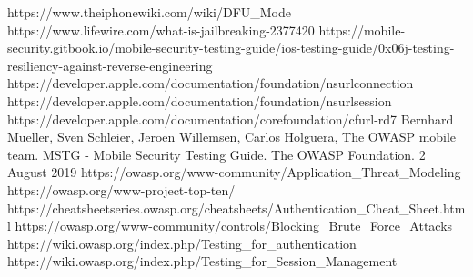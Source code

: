 \documentclass[runningheads]{llncs}
\begin{document}


\newpage
\hfill

%





%
%
%
% 
% 
%

\begin{thebibliography}{8}


 https://www.theiphonewiki.com/wiki/DFU\_Mode
 https://www.lifewire.com/what-is-jailbreaking-2377420
 https://mobile-security.gitbook.io/mobile-security-testing-guide/ios-testing-guide/0x06j-testing-resiliency-against-reverse-engineering
 https://developer.apple.com/documentation/foundation/nsurlconnection
 https://developer.apple.com/documentation/foundation/nsurlsession
 https://developer.apple.com/documentation/corefoundation/cfurl-rd7
 Bernhard Mueller, Sven Schleier, Jeroen Willemsen, Carlos Holguera, The OWASP mobile team. MSTG - Mobile Security Testing Guide. The OWASP Foundation. 2 August 2019
 https://owasp.org/www-community/Application\_Threat\_Modeling
 https://owasp.org/www-project-top-ten/
 https://cheatsheetseries.owasp.org/cheatsheets/Authentication\_Cheat\_Sheet.html
 https://owasp.org/www-community/controls/Blocking\_Brute\_Force\_Attacks
 https://wiki.owasp.org/index.php/Testing\_for\_authentication
 https://wiki.owasp.org/index.php/Testing\_for\_Session\_Management

\end{thebibliography}
\end{document}
